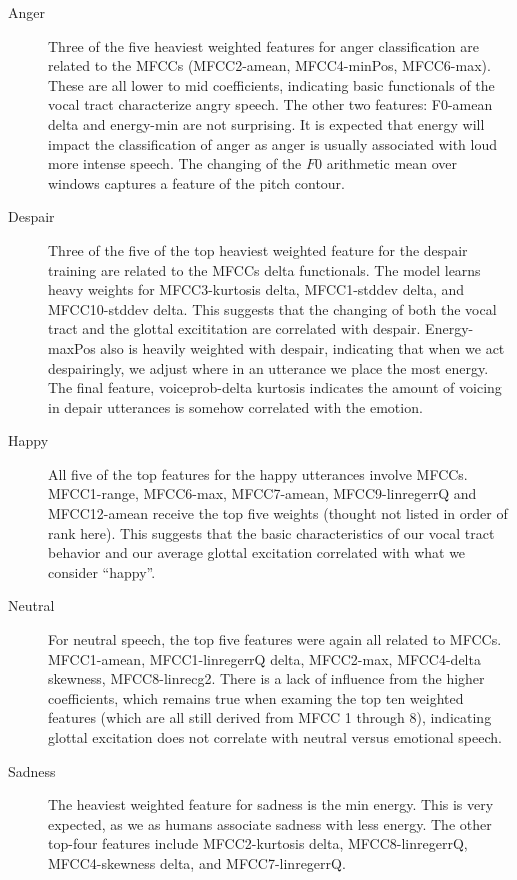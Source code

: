 \documentclass[twocolumn, 11pt]{article}
\begin{document}
\begin{description}

  \item[Anger] Three of the five heaviest weighted features for anger
  classification are related to the MFCCs  (MFCC2-amean,  MFCC4-minPos,
  MFCC6-max). These are all lower to mid coefficients, indicating basic
  functionals of the vocal tract characterize angry speech. The other two
  features: F0-amean delta and energy-min are not surprising. It is expected
  that energy will impact the classification of anger as anger is usually
  associated with loud more intense speech. The changing of the $F0$ arithmetic
  mean over windows captures a feature of the pitch contour.

  \item[Despair] Three of the five of the top heaviest weighted feature for the
  despair training are related to the MFCCs delta functionals. The model learns
  heavy weights for MFCC3-kurtosis delta,  MFCC1-stddev delta, and
  MFCC10-stddev delta. This suggests that the changing of both the vocal tract
  and the glottal excititation are correlated with despair. Energy-maxPos also
  is heavily weighted with despair, indicating that when we act despairingly,
  we adjust where in an utterance we place the most energy. The final feature,
  voiceprob-delta kurtosis indicates the amount of voicing in depair utterances
  is somehow correlated with the emotion.

  \item[Happy] All five of the top features for the happy utterances involve
  MFCCs. MFCC1-range, MFCC6-max, MFCC7-amean, MFCC9-linregerrQ and MFCC12-amean
  receive the top five weights (thought not listed in order of rank here). This
  suggests that the basic characteristics of our vocal tract behavior and our
  average glottal excitation correlated with what we consider ``happy''.

  \item[Neutral] For neutral speech, the top five features were again all
  related to MFCCs. MFCC1-amean, MFCC1-linregerrQ delta, MFCC2-max, MFCC4-delta
  skewness, MFCC8-linrecg2. There is a lack of influence from the higher
  coefficients, which remains true when examing the top ten weighted features
  (which are all still derived from MFCC 1 through 8), indicating glottal
  excitation does not correlate with neutral versus emotional speech.

  \item[Sadness] The heaviest weighted feature for sadness is the min energy.
  This is very expected, as we as humans associate sadness with less energy.
  The other top-four features include MFCC2-kurtosis delta, MFCC8-linregerrQ,
  MFCC4-skewness delta, and MFCC7-linregerrQ.

\end{description}
\end{document}
